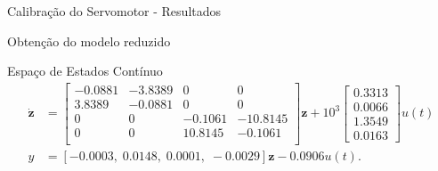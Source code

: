 \documentclass[10pt]{beamer}
\newcommand\Fontvii{\fontsize{7}{8.2}\selectfont}
\begin{document}
\begin{frame}[fragile]{Calibração do Servomotor - Resultados}

\begin{table}[!ht]
\centering
\caption{Dados de calibração do servomotor, média obtida é de 71.32 mm/unidade\label{calibracaoServomotor}}
\end{table}

\end{frame}

\begin{frame}[fragile]{Obtenção do modelo reduzido}
\begin{block}{Espaço de Estados Contínuo}
\Fontvii
\begin{align}
\dot{\mathbf{z}} &= \left[\begin{array}{cccc}
		-0.0881  & -3.8389 &         0 &         0\\
    3.8389 &   -0.0881 &         0 &         0\\
         0 &         0 &   -0.1061 &  -10.8145\\
         0 &        0 &   10.8145 &   -0.1061\\
	\end{array}\right]\mathbf{z} + 10^3 \left[\begin{array}{c}
	0.3313 \\
	    0.0066 \\
	    1.3549 \\
	    0.0163
	 \end{array}\right]u(t) \\
y &= \left[-0.0003,\;0.0148,\;0.0001,\;-0.0029\right]\mathbf{z} - 0.0906 u(t).
\end{align}
\end{block}
\end{frame}
\end{document}
